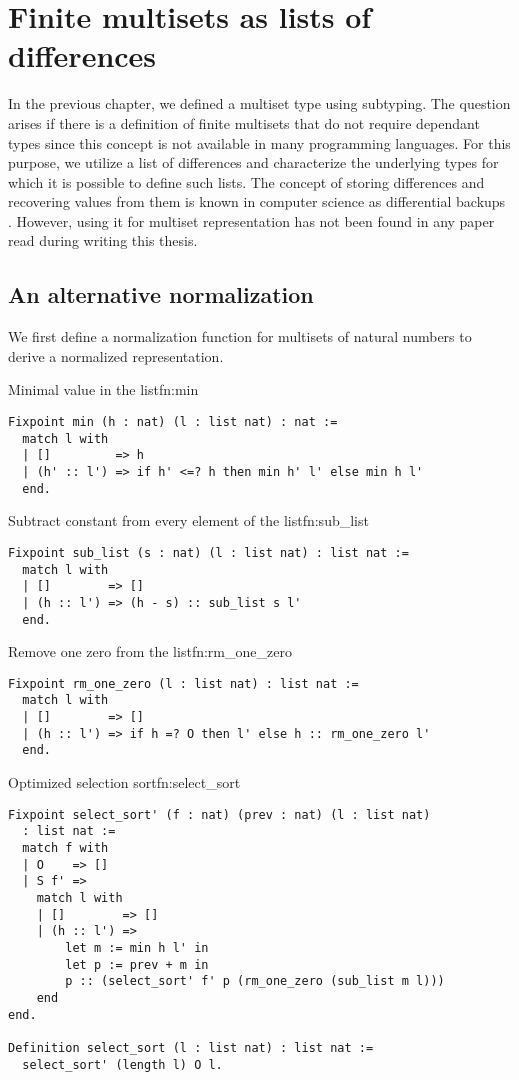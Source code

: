 \section{Finite multisets as lists of differences}
In the previous chapter, we defined a multiset type using subtyping. The question arises if there is a definition of finite multisets that do not require dependant types since this concept is not available in many programming languages. For this purpose, we utilize a list of differences and characterize the underlying types for which it is possible to define such lists. The concept of storing differences and recovering values from them is known in computer science as differential backups \cite{DiffBackups}. However, using it for multiset representation has not been found in any paper read during writing this thesis.
\subsection{An alternative normalization}
We first define a normalization function for multisets of natural numbers to derive a normalized representation.
\begin{func}{Minimal value in the list}{fn:min}
\begin{verbatim}
Fixpoint min (h : nat) (l : list nat) : nat :=
  match l with
  | []         => h
  | (h' :: l') => if h' <=? h then min h' l' else min h l'
  end.
\end{verbatim}
\end{func}
\begin{func}{Subtract constant from every element of the list}{fn:sub_list}
\begin{verbatim}
Fixpoint sub_list (s : nat) (l : list nat) : list nat :=
  match l with
  | []        => []
  | (h :: l') => (h - s) :: sub_list s l'
  end.
\end{verbatim}
\end{func}
\begin{func}{Remove one zero from the list}{fn:rm_one_zero}
\begin{verbatim}
Fixpoint rm_one_zero (l : list nat) : list nat :=
  match l with
  | []        => []
  | (h :: l') => if h =? O then l' else h :: rm_one_zero l'
  end.
\end{verbatim}
\end{func}
\begin{func}[D]{Optimized selection sort}{fn:select_sort}
\begin{verbatim}
Fixpoint select_sort' (f : nat) (prev : nat) (l : list nat) 
  : list nat :=
  match f with
  | O    => []
  | S f' =>
    match l with
    | []        => []
    | (h :: l') => 
        let m := min h l' in
        let p := prev + m in
        p :: (select_sort' f' p (rm_one_zero (sub_list m l)))
    end
end.

Definition select_sort (l : list nat) : list nat :=
  select_sort' (length l) O l.
\end{verbatim}
\end{func}
